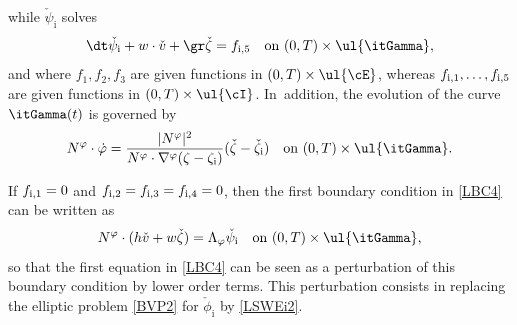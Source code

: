 while $\check{\psi}_\mathrm{i}$ solves
\begin{equation}\label{LBC4bis}
\dt\check{\psi}_\mathrm{i}+w\cdot\check{v}+\gr\check{\zeta}=f_{{\rm i},5} \quad \text{on } (0,T)\times\ul{\itGamma},
\end{equation}
and where $f_1,f_2,f_3$ are given functions in $(0,T)\times\ul{\cE}$, whereas $f_{{\rm i},1},\ldots,f_{{\rm i},5}$ are given functions in $(0,T)\times\ul{\cI}$. In~addition, the evolution of the curve $\itGamma(t)$ is governed by
\begin{equation}\label{EqPhibis}
N^\varphi\cdot\dot{\varphi} = \frac{|N^\varphi|^2}{N^\varphi\cdot\nabla^\varphi(\zeta-\zeta_\mathrm{i})}(\check{\zeta} -\check{\zeta}_\mathrm{i})
\quad\text{on } (0,T)\times\ul{\itGamma}.
\end{equation}

\begin{remark}
If $f_{{\rm i},1}=0$ and $f_{{\rm i},2}=f_{{\rm i},3}=f_{{\rm i},4}=0$, then the first boundary condition in \eqref{LBC4} can be written as
\[
N^\varphi\cdot(h\check{v}+w\check{\zeta}) = \Lambda_\varphi \check{\psi}_\mathrm{i}\quad \text{on } (0,T)\times \ul{\itGamma},
\]
so that the first equation in \eqref{LBC4} can be seen as a perturbation of this boundary condition by lower order terms.
This perturbation consists in replacing the elliptic problem \eqref{BVP2} for $\check{\phi}_\mathrm{i}$ by \eqref{LSWEi2}.
\end{remark}

